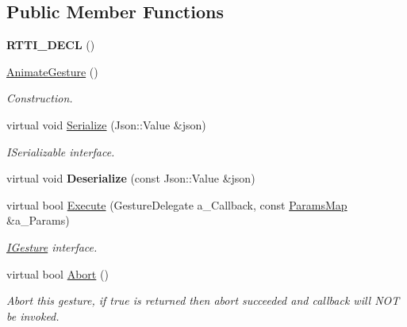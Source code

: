 \subsection*{Public Member Functions}
\begin{DoxyCompactItemize}
\item 
\mbox{\label{class_animate_gesture_ad111db7e57cc39136a8f073a4ae04d56}} 
{\bfseries R\+T\+T\+I\+\_\+\+D\+E\+CL} ()
\item 
\mbox{\label{class_animate_gesture_a4db752a229224a48445d80c9168cf758}} 
\hyperlink{class_animate_gesture_a4db752a229224a48445d80c9168cf758}{Animate\+Gesture} ()
\begin{DoxyCompactList}\small\item\em Construction. \end{DoxyCompactList}\item 
\mbox{\label{class_animate_gesture_ac3f44e46cea494d3bbdb0ed72bc0dc48}} 
virtual void \hyperlink{class_animate_gesture_ac3f44e46cea494d3bbdb0ed72bc0dc48}{Serialize} (Json\+::\+Value \&json)
\begin{DoxyCompactList}\small\item\em I\+Serializable interface. \end{DoxyCompactList}\item 
\mbox{\label{class_animate_gesture_a2612e96d9fe1002e113fc86005ba1dcc}} 
virtual void {\bfseries Deserialize} (const Json\+::\+Value \&json)
\item 
\mbox{\label{class_animate_gesture_afa38a88906eb256fcaabe18e4c18b3eb}} 
virtual bool \hyperlink{class_animate_gesture_afa38a88906eb256fcaabe18e4c18b3eb}{Execute} (Gesture\+Delegate a\+\_\+\+Callback, const \hyperlink{class_params_map}{Params\+Map} \&a\+\_\+\+Params)
\begin{DoxyCompactList}\small\item\em \hyperlink{class_i_gesture}{I\+Gesture} interface. \end{DoxyCompactList}\item 
\mbox{\label{class_animate_gesture_a7da2db6241a173a7a0acfc3370b1ada4}} 
virtual bool \hyperlink{class_animate_gesture_a7da2db6241a173a7a0acfc3370b1ada4}{Abort} ()
\begin{DoxyCompactList}\small\item\em Abort this gesture, if true is returned then abort succeeded and callback will N\+OT be invoked. \end{DoxyCompactList}\end{DoxyCompactItemize}
